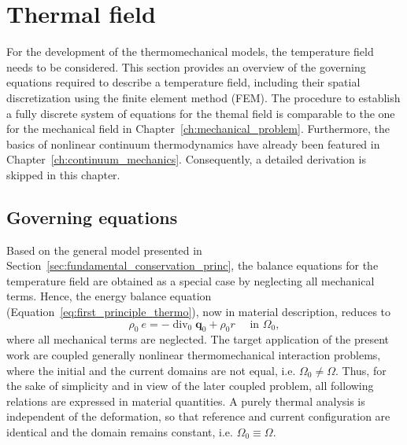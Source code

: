 \chapter{Thermal field} \label{ch:thermal_problem}

For the development of the thermomechanical models, the temperature field needs to be considered.
This section provides an overview of the governing equations required to describe a temperature field, including their spatial discretization using the finite element method (FEM).
The procedure to establish a fully discrete system of equations for the themal field is comparable to the one for the mechanical field in Chapter~\ref{ch:mechanical_problem}.
Furthermore, the basics of nonlinear continuum thermodynamics have already been featured in Chapter~\ref{ch:continuum_mechanics}.
Consequently, a detailed derivation is skipped in this chapter.


\section{Governing equations}

Based on the general model presented in Section~\ref{sec:fundamental_conservation_princ}, the balance equations for the temperature field are obtained as a special case by neglecting all mechanical terms.
Hence, the energy balance equation (Equation~\eqref{eq:first_principle_thermo}), now in material description, reduces to
\begin{equation} \label{eq:strong_energy_eq}
\rho_0\ e=-\operatorname{div}_0 \bm q_0+\rho_0 r \quad \text { in } \Omega_0,
\end{equation}
where all mechanical terms are neglected.
The target application of the present work are coupled generally nonlinear thermomechanical interaction problems, where the initial and the current domains are not equal, i.e. \(\Omega_{0} \neq \Omega\).
Thus, for the sake of simplicity and in view of the later coupled problem, all following relations are expressed in material quantities.
A purely thermal analysis is independent of the deformation, so that reference and current configuration are identical and the domain remains constant, i.e. \(\Omega_{0} \equiv \Omega\).

